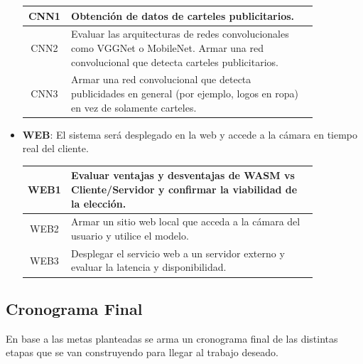 \documentclass[a4paper]{article}
\begin{document}
\begin{itemize}
\begin{center}
\begin{tabular}{c m{0.85\linewidth}} \toprule
    CNN1 & Obtención de datos de carteles publicitarios. \\ \midrule
    CNN2 & Evaluar las arquitecturas de redes convolucionales como VGGNet o MobileNet. \newline Armar una red convolucional que detecta carteles publicitarios. \\ \midrule
    CNN3 & Armar una red convolucional que detecta publicidades en general (por ejemplo, logos en ropa) en vez de solamente carteles. \\ \bottomrule
\end{tabular}
\end{center}

\item \textbf{WEB}: El sistema será desplegado en la web y accede a la cámara en tiempo real del cliente.

\begin{center}
\begin{tabular}{c m{0.85\linewidth}} \toprule
    WEB1 & Evaluar ventajas y desventajas de WASM vs Cliente/Servidor y confirmar la viabilidad de la elección. \\ \midrule
    WEB2 & Armar un sitio web local que acceda a la cámara del usuario y utilice el modelo. \\ \midrule
    WEB3 & Desplegar el servicio web a un servidor externo y evaluar la latencia y disponibilidad. \\ \bottomrule
\end{tabular}
\end{center}
\end{itemize}

\subsection{Cronograma Final}

En base a las metas planteadas se arma un cronograma final de las distintas etapas que se van construyendo para llegar al trabajo deseado.
\end{document}
